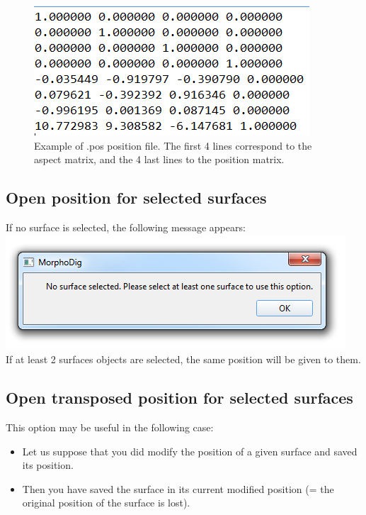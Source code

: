 \begin{figure}
  \centering
  \includegraphics[scale=0.5]{images/07/position/position_file.png}
 \caption{Example of .pos position file. The first 4 lines correspond
to the aspect matrix, and the 4 last lines to the position matrix.}
\label{position_file}
\end{figure}
 



\subsection{Open position for selected surfaces}
If no surface is selected, the following message
appears:\\
\includegraphics[scale=0.5]{images/07/position/no_surface_selected.png}
\\
If at least 2 surfaces objects are selected, the same position will be given to them.

\subsection{Open transposed position for selected surfaces}
This option may be useful in the following case:
\begin{itemize}
\item Let us suppose that you did modify the position of a given surface and saved its position.
\item Then you have saved the surface in its current modified position (= the original position of the
surface is lost).
\end{itemize}


